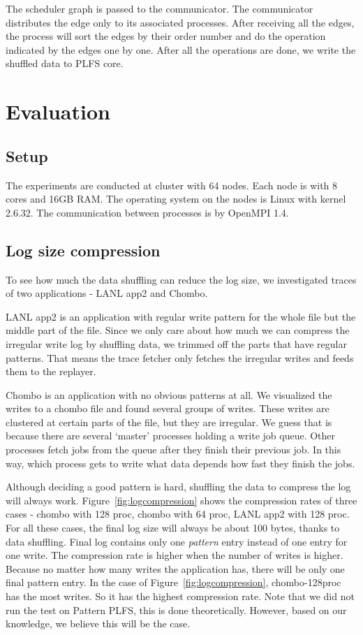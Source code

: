 \documentclass{acm_proc_article-sp}
\begin{document}
The scheduler graph is passed to the communicator.
The communicator distributes the edge
only to its associated processes. After
receiving all the edges, the process
will sort the edges by their order number
and do the operation indicated by the edges
one by one. After all the operations are done,
we write the shuffled data to PLFS core. 



\section{Evaluation}
\label{sec:evaluation}
\subsection{Setup}
The experiments are conducted at 
cluster with 64 nodes.
Each node is with 8 cores and 16GB RAM.
The operating system on the nodes
is Linux with kernel 2.6.32.
The communication between
processes is by OpenMPI 1.4.

\subsection{Log size compression}
To see how much the data shuffling
can reduce the log size, we investigated
traces of two applications - LANL app2
and Chombo. 

LANL app2 is an application with 
regular write pattern for the whole
file but the middle part of the file.
Since we only care about how much
we can compress the irregular write
log by shuffling data, we trimmed off
the parts that have regular patterns.
That means the trace fetcher only
fetches the irregular writes and
feeds them to the replayer. 

Chombo is an application with no
obvious patterns at all. We visualized
the writes to a chombo file
and found several groups of writes.
These writes are clustered at
certain parts of the file, but they
are irregular. We guess that
is because there are several `master'
processes holding a write job queue.
Other processes fetch jobs from the
queue after they finish their previous job.
In this way, which process gets to write
what data depends how fast they finish
the jobs.

Although deciding a good pattern is hard,
shuffling the data to compress
the log will always work. Figure~\ref{fig:logcompression}
shows the compression rates of three
cases - chombo with 128 proc, chombo with 64 proc,
LANL app2 with 128 proc. For all these
cases, the final log size will always be
about 100 bytes, thanks to data shuffling. 
Final log contains only one \emph{pattern} entry
instead of one entry for one write.
The compression rate is higher when the number
of writes is higher. Because no matter how
many writes the application has, there will
be only one final pattern entry. In the 
case of Figure~\ref{fig:logcompression},
chombo-128proc has the most writes.
So it has the highest compression rate. 
Note that we did not run the test on Pattern PLFS,
this is done theoretically. However,
based on our knowledge, we believe this will be the case.
\end{document}
